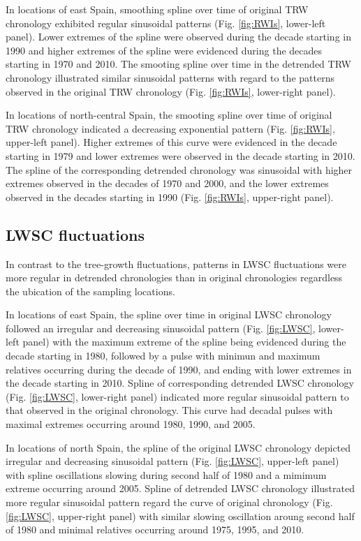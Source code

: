\documentclass[review,authoryear]{elsarticle}
\begin{document}
In locations of east Spain, smoothing spline over time of original
\gls{TRW} chronology exhibited regular sinusoidal patterns
(Fig. \ref{fig:RWIs}, lower-left panel). Lower extremes of the spline
were observed during the decade starting in 1990 and higher extremes
of the spline were evidenced during the decades starting in 1970 and
2010. The smooting spline over time in the detrended \gls{TRW}
chronology illustrated similar sinusoidal patterns with regard to the
patterns observed in the original \gls{TRW} chronology
(Fig. \ref{fig:RWIs}, lower-right panel).

In locations of north-central Spain, the smooting spline over time of
original \gls{TRW} chronology indicated a decreasing exponential
pattern (Fig. \ref{fig:RWIs}, upper-left panel). Higher extremes of
this curve were evidenced in the decade starting in 1979 and lower
extremes were observed in the decade starting in 2010. The spline of
the corresponding detrended chronology was sinusoidal with higher
extremes observed in the decades of 1970 and 2000, and the lower
extremes observed in the decades starting in 1990
(Fig. \ref{fig:RWIs}, upper-right panel).

\subsection{\acrlong{LWSC} fluctuations}
In contrast to the tree-growth fluctuations, patterns in \acrfull{LWSC}
fluctuations were more regular in detrended chronologies than in
original chronologies regardless the ubication of the sampling
locations.

In locations of east Spain, the spline over time in original
\gls{LWSC} chronology followed an irregular and decreasing sinusoidal
pattern (Fig. \ref{fig:LWSC}, lower-left panel) with the maximum
extreme of the spline being evidenced during the decade starting in
1980, followed by a pulse with minimun and maximum relatives occurring
during the decade of 1990, and ending with lower extremes in the
decade starting in 2010.  Spline of corresponding detrended \gls{LWSC}
chronology (Fig. \ref{fig:LWSC}, lower-right panel) indicated more
regular sinusoidal pattern to that observed in the original
chronology. This curve had decadal pulses with maximal extremes
occurring around 1980, 1990, and 2005.

In locations of north Spain, the spline of the original \gls{LWSC}
chronology depicted irregular and decreasing sinusoidal pattern
(Fig. \ref{fig:LWSC}, upper-left panel) with spline oscillations
slowing during second half of 1980 and a mimimum extreme occurring
around 2005. Spline of detrended \gls{LWSC} chronology illustrated
more regular sinusoidal pattern regard the curve of original
chronology (Fig. \ref{fig:LWSC}, upper-right panel) with similar
slowing oscillation aroung second half of 1980 and minimal relatives
occurring around 1975, 1995, and 2010.
\end{document}
